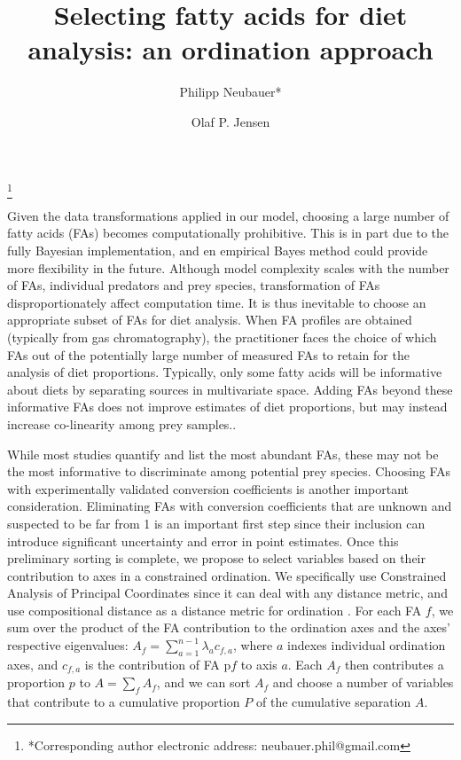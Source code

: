 \documentclass[12pt]{article}
\begin{document}
\renewcommand\footnotemark{}

\author{Philipp Neubauer*}\thanks{*Corresponding author electronic address: neubauer.phil@gmail.com}%
%

\author{Olaf P. Jensen}%
%


\title{Selecting fatty acids for diet analysis: an ordination approach}
\maketitle

Given the data transformations applied in our model, choosing a large
number of fatty acids (FAs) becomes computationally
prohibitive. This is in part due to the fully Bayesian implementation,
and en empirical Bayes method could provide more flexibility in the
future. Although model complexity scales with the number of FAs,
individual predators and prey species, transformation of FAs disproportionately affect computation time. It is thus inevitable to
choose an appropriate subset of FAs for diet analysis. When FA
profiles are obtained (typically from gas chromatography), the
practitioner faces the choice of which FAs out of the potentially
large number of measured FAs to retain for the analysis of diet
proportions. Typically, only some fatty acids will be informative about diets by separating sources in multivariate space. Adding FAs beyond these informative FAs does not improve estimates of diet proportions, but may instead increase co-linearity among prey samples..

While most studies quantify and list the most abundant FAs, these may
not be the most informative to discriminate among potential prey
species. Choosing FAs with experimentally validated conversion
coefficients is another important consideration. Eliminating FAs with
conversion coefficients that are unknown and suspected to be far from
1 is an important first step since their inclusion can introduce
significant uncertainty and error in point estimates. Once this
preliminary sorting is complete, we propose to select variables based
on their contribution to axes in a constrained ordination. We
specifically use Constrained Analysis of Principal Coordinates
\citep{anderson_canonical_2003} since it can deal with any distance
metric, and use compositional distance as a distance metric for
ordination \cite{aitchison_logratio_2000}. For each FA $f$, we sum over
the product of the FA contribution to the ordination axes and the
axes’ respective eigenvalues: $A_f = \sum_{a=1}^{n-1} \lambda_a
c_{f,a}$, where $a$ indexes individual ordination axes, and $c_{f,a}$ is the
contribution of FA p$f$ to axis $a$. Each $A_f$ then contributes a
proportion $p$ to $A=\sum_f A_f$, and we can sort $A_f$ and choose a
number of variables that contribute to a cumulative proportion $P$ of the
cumulative separation $A$.


\printbibliography
\end{document}
